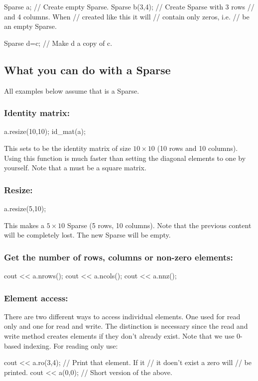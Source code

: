\begin{code}
Sparse a;          // Create empty Sparse.
Sparse b(3,4);     // Create Sparse with 3 rows
                   // and 4 columns. When
                   // created like this it will
                   // contain only zeros, i.e.
                   // be an empty Sparse.

Sparse d=c;        // Make d a copy of c.
\end{code}

\subsection{What you can do with a Sparse}
All examples below assume that  is a Sparse.

\subsubsection{Identity matrix:}
\begin{code}
a.resize(10,10);
id_mat(a);
\end{code}
This sets  to be the identity matrix of size $10 \times 10$ (10 rows
and 10 columns). Using this function is much faster than setting the
diagonal elements to one by yourself. Note that a must be a square matrix.

\subsubsection{Resize:}
\begin{code}
a.resize(5,10);
\end{code}
This makes  a $5 \times 10$ Sparse (5 rows, 10 columns). Note that the
previous content will be completely lost. The new Sparse will be empty.

\subsubsection{Get the number of rows, columns or non-zero elements:}
\begin{code}
cout << a.nrows();
cout << a.ncols();
cout << a.nnz();
\end{code}

\subsubsection{Element access:}
There are two different ways to access individual elements. One used for
read only and one for read and write. The distinction is necessary since
the read and write method creates elements if they don't already exist.
Note that we use 0-based indexing. For reading only use:
\begin{code}
cout << a.ro(3,4);  // Print that element. If it
                    // it doen't exist a zero will
                    // be printed.
cout << a(0,0);     // Short version of the above.
\end{code}

